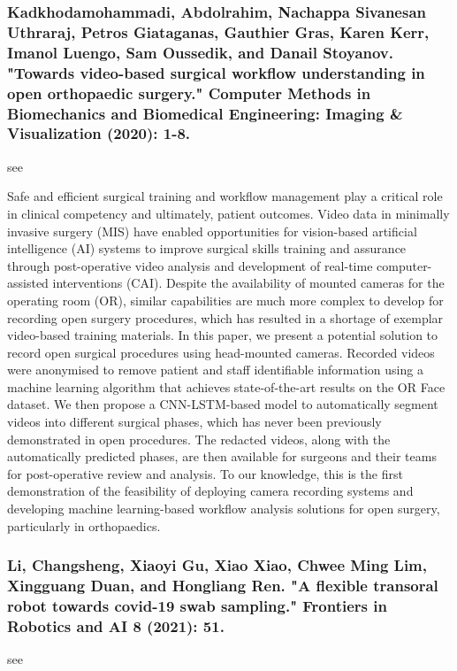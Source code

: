 \documentclass[conference]{IEEEtran}
\begin{document}
\medskip
\subsubsection{Kadkhodamohammadi, Abdolrahim, Nachappa Sivanesan Uthraraj, Petros Giataganas, Gauthier Gras, Karen Kerr, Imanol Luengo, Sam Oussedik, and Danail Stoyanov. "Towards video-based surgical workflow understanding in open orthopaedic surgery." Computer Methods in Biomechanics and Biomedical Engineering: Imaging \& Visualization (2020): 1-8.}
see \cite{kadkhodamohammadi2020towards}

Safe and efficient surgical training and workflow management play a critical role in clinical competency and ultimately, patient outcomes. Video data in minimally invasive surgery (MIS) have enabled opportunities for vision-based artificial intelligence (AI) systems to improve surgical skills training and assurance through post-operative video analysis and development of real-time computer-assisted interventions (CAI). Despite the availability of mounted cameras for the operating room (OR), similar capabilities are much more complex to develop for recording open surgery procedures, which has resulted in a shortage of exemplar video-based training materials. In this paper, we present a potential solution to record open surgical procedures using head-mounted cameras. Recorded videos were anonymised to remove patient and staff identifiable information using a machine learning algorithm that achieves state-of-the-art results on the OR Face dataset. We then propose a CNN-LSTM-based model to automatically segment videos into different surgical phases, which has never been previously demonstrated in open procedures. The redacted videos, along with the automatically predicted phases, are then available for surgeons and their teams for post-operative review and analysis. To our knowledge, this is the first demonstration of the feasibility of deploying camera recording systems and developing machine learning-based workflow analysis solutions for open surgery, particularly in orthopaedics.

\medskip
\subsubsection{Li, Changsheng, Xiaoyi Gu, Xiao Xiao, Chwee Ming Lim, Xingguang Duan, and Hongliang Ren. "A flexible transoral robot towards covid-19 swab sampling." Frontiers in Robotics and AI 8 (2021): 51.}
see \cite{li2021flexible}
\end{document}
